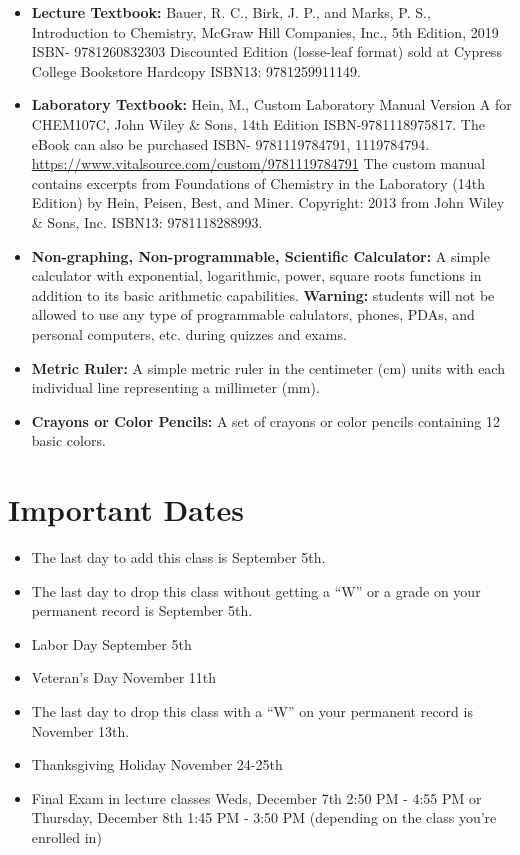 \documentclass[11pt]{article}
\begin{document}
\begin{itemize}
\item \textbf{Lecture Textbook:} Bauer, R. C., Birk, J. P., and Marks, P. S., Introduction
  to Chemistry, McGraw Hill Companies, Inc., 5th Edition, 2019 ISBN- 9781260832303
  Discounted Edition (losse-leaf format) sold at Cypress College Bookstore 
  Hardcopy ISBN13: 9781259911149.
\item \textbf{Laboratory Textbook:} Hein, M., Custom Laboratory Manual Version A for CHEM107C,
  John Wiley \& Sons, 14th Edition ISBN-9781118975817.
  The eBook can also be purchased ISBN- 9781119784791, 1119784794.
  \url{https://www.vitalsource.com/custom/9781119784791}
  The custom manual contains excerpts from Foundations of Chemistry in the Laboratory
  (14th Edition) by Hein, Peisen, Best, and Miner.  Copyright: 2013 from John Wiley \& Sons,
  Inc. ISBN13: 9781118288993.
\item \textbf{Non-graphing, Non-programmable, Scientific Calculator:}
  A simple calculator with exponential, logarithmic, power, square roots functions in
  addition to its basic arithmetic capabilities. \textbf{Warning:} students will not be allowed
  to use any type of programmable calulators, phones, PDAs, and personal computers, etc.
  during quizzes and exams.
\item \textbf{Metric Ruler:} A simple metric ruler in the centimeter (cm) units with each individual
  line representing a millimeter (mm). 
\item \textbf{Crayons or Color Pencils:} A set of crayons or color pencils containing 12 basic colors.    
\end{itemize}

\section{Important Dates}
\begin{itemize}
\item The last day to add this class is September 5th.
\item The last day to drop this class without getting a “W” or a grade on your permanent
  record is September 5th.
\item Labor Day September 5th
\item Veteran’s Day November 11th
\item The last day to drop this class with a “W” on your permanent record is November 13th.
\item Thanksgiving Holiday November 24-25th
\item Final Exam in lecture classes Weds, December 7th 2:50 PM - 4:55 PM or
  Thursday, December 8th 1:45 PM - 3:50 PM (depending on the class you're enrolled in)
\end{itemize}
\end{document}
